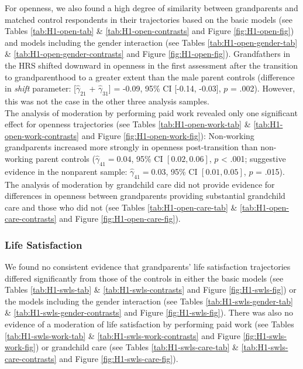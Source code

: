 \documentclass[
  english,
  man,floatsintext]{apa7}
\begin{document}
For openness, we also found a high degree of similarity between grandparents and matched control respondents in their trajectories based on the basic models (see Tables \ref{tab:H1-open-tab} \& \ref{tab:H1-open-contrasts} and Figure \ref{fig:H1-open-fig}) and models including the gender interaction (see Tables \ref{tab:H1-open-gender-tab} \& \ref{tab:H1-open-gender-contrasts} and Figure \ref{fig:H1-open-fig}). Grandfathers in the HRS shifted downward in openness in the first assessment after the transition to grandparenthood to a greater extent than the male parent controls (difference in \emph{shift} parameter: {[}\(\hat{\gamma}_{21}\) + \(\hat{\gamma}_{31}\){]} = -0.09, 95\% CI {[}-0.14, -0.03{]}, \(p\) = .002). However, this was not the case in the other three analysis samples.\\
The analysis of moderation by performing paid work revealed only one significant effect for openness trajectories (see Tables \ref{tab:H1-open-work-tab} \& \ref{tab:H1-open-work-contrasts} and Figure \ref{fig:H1-open-work-fig}): Non-working grandparents increased more strongly in openness post-transition than non-working parent controls (\(\hat{\gamma}_{41} = 0.04\), 95\% CI \([0.02, 0.06]\), \(p\) \textless{} .001; suggestive evidence in the nonparent sample: \(\hat{\gamma}_{41} = 0.03\), 95\% CI \([0.01, 0.05]\), \(p\) = .015). The analysis of moderation by grandchild care did not provide evidence for differences in openness between grandparents providing substantial grandchild care and those who did not (see Tables \ref{tab:H1-open-care-tab} \& \ref{tab:H1-open-care-contrasts} and Figure \ref{fig:H1-open-care-fig}).

\hypertarget{life-satisfaction-1}{%
\subsubsection{Life Satisfaction}\label{life-satisfaction-1}}

We found no consistent evidence that grandparents' life satisfaction trajectories differed significantly from those of the controls in either the basic models (see Tables \ref{tab:H1-swls-tab} \& \ref{tab:H1-swls-contrasts} and Figure \ref{fig:H1-swls-fig}) or the models including the gender interaction (see Tables \ref{tab:H1-swls-gender-tab} \& \ref{tab:H1-swls-gender-contrasts} and Figure \ref{fig:H1-swls-fig}). There was also no evidence of a moderation of life satisfaction by performing paid work (see Tables \ref{tab:H1-swls-work-tab} \& \ref{tab:H1-swls-work-contrasts} and Figure \ref{fig:H1-swls-work-fig}) or grandchild care (see Tables \ref{tab:H1-swls-care-tab} \& \ref{tab:H1-swls-care-contrasts} and Figure \ref{fig:H1-swls-care-fig}).
\end{document}
